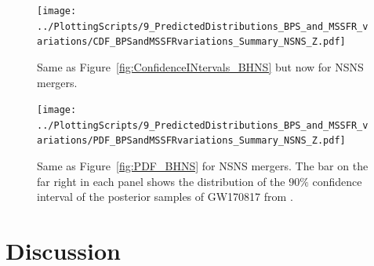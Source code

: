 \documentclass[twocolumn]{aastex63}
\newcommand\bhnsSingle{BHNS\xspace}
\begin{document}
%
\begin{figure}
    \centering
\texttt{[image: ../PlottingScripts/9\_PredictedDistributions\_BPS\_and\_MSSFR\_variations/CDF\_BPSandMSSFRvariations\_Summary\_NSNS\_Z.pdf]} 
\caption{Same as Figure~\ref{fig:ConfidenceINtervals_BHNS} but now for \ac{NSNS} mergers.}
    \label{fig:ConfidenceINtervals_NSNS}
\end{figure}
%
\begin{figure}
    \centering
%
\texttt{[image: ../PlottingScripts/9\_PredictedDistributions\_BPS\_and\_MSSFR\_variations/PDF\_BPSandMSSFRvariations\_Summary\_NSNS\_Z.pdf]} %
%
%
    \caption{Same as Figure~\ref{fig:PDF_BHNS} for \ac{NSNS} mergers. The bar on the far right in each panel shows the distribution of the $90\%$ confidence interval of the posterior samples of GW170817 from \citep{2019PhRvX...9c1040A}.   }
    
    \label{fig:PDF_NSNS}
\end{figure}
%





\section{Discussion }
\label{sec:discussion}
\end{document}
